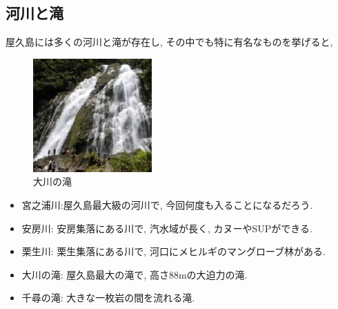 \documentclass[10pt,titlepage,a5paper]{ltjsbook}
\begin{document}
    \subsection*{河川と滝}
      屋久島には多くの河川と滝が存在し, その中でも特に有名なものを挙げると,
      \begin{minipage}{0.38\columnwidth}
        \begin{figure}[H]
          \centering
          \includegraphics[width=\columnwidth]{okotaki.jpg}
          \caption{大川の滝}
          \label{fig:yakushima_river}
        \end{figure}
      \end{minipage}
      \begin{minipage}{0.58\columnwidth}
        \vspace{2em}
        \begin{itemize}
          \item 宮之浦川:屋久島最大級の河川で, 今回何度も入ることになるだろう.
          \item 安房川: 安房集落にある川で, 汽水域\footnotemark[4] が長く, カヌーやSUPができる.
          \item 栗生川: 栗生集落にある川で, 河口にメヒルギのマングローブ林がある. 
          \item 大川の滝: 屋久島最大の滝で, 高さ88mの大迫力の滝.
          \item 千尋の滝: 大きな一枚岩の間を流れる滝. 
        \end{itemize}
      \end{minipage}
\end{document}
